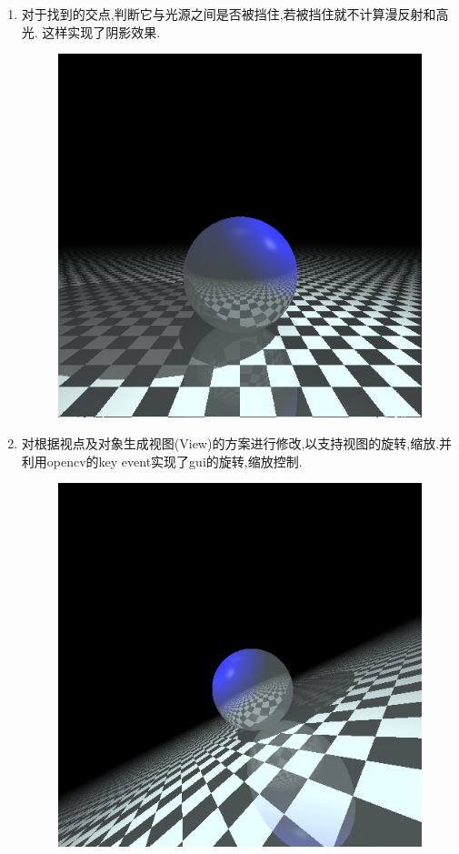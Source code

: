 \begin{enumerate}
  \item
    对于找到的交点,判断它与光源之间是否被挡住,若被挡住就不计算漫反射和高光. 这样实现了阴影效果.
    \begin{figure}[H]
      \centering
      \includegraphics[scale=0.4]{img/shadow.png}
      \caption*{\label{fig:shadow}}
    \end{figure}

  \item 对根据视点及对象生成视图(View)的方案进行修改,以支持视图的旋转,缩放.并利用opencv的key event实现了gui的旋转,缩放控制.
    \begin{figure}[H]
      \centering
      \includegraphics[scale=0.4]{img/rotate.png}
      \caption*{\label{fig:rotate}}
    \end{figure}


\end{enumerate}
